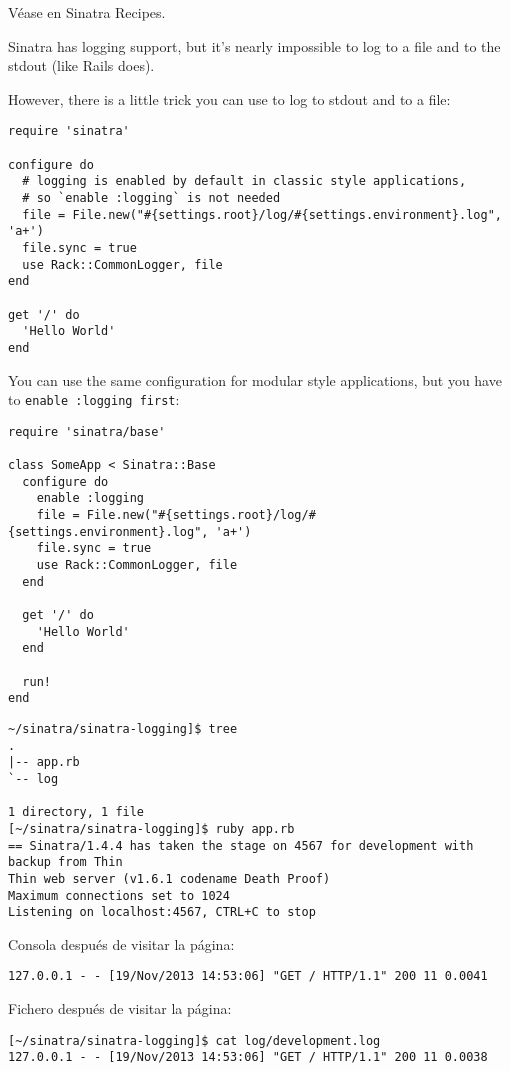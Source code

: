 
Véase 
en Sinatra Recipes.

Sinatra has logging support, but it's nearly impossible to log to a file and to the stdout (like Rails does).

However, there is a little trick you can use to log to stdout and to a file:

\begin{verbatim}
require 'sinatra'

configure do
  # logging is enabled by default in classic style applications,
  # so `enable :logging` is not needed
  file = File.new("#{settings.root}/log/#{settings.environment}.log", 'a+')
  file.sync = true
  use Rack::CommonLogger, file
end

get '/' do
  'Hello World'
end
\end{verbatim}
You can use the same configuration for modular style applications,
but you have to \verb|enable :logging first|:

\begin{verbatim}
require 'sinatra/base'

class SomeApp < Sinatra::Base
  configure do
    enable :logging
    file = File.new("#{settings.root}/log/#{settings.environment}.log", 'a+')
    file.sync = true
    use Rack::CommonLogger, file
  end

  get '/' do
    'Hello World'
  end

  run!
end
\end{verbatim}

\begin{verbatim}
~/sinatra/sinatra-logging]$ tree
.
|-- app.rb
`-- log

1 directory, 1 file
[~/sinatra/sinatra-logging]$ ruby app.rb 
== Sinatra/1.4.4 has taken the stage on 4567 for development with backup from Thin
Thin web server (v1.6.1 codename Death Proof)
Maximum connections set to 1024
Listening on localhost:4567, CTRL+C to stop
\end{verbatim}
Consola después de visitar la página:
\begin{verbatim}
127.0.0.1 - - [19/Nov/2013 14:53:06] "GET / HTTP/1.1" 200 11 0.0041
\end{verbatim}

Fichero después de visitar la página:
\begin{verbatim}
[~/sinatra/sinatra-logging]$ cat log/development.log 
127.0.0.1 - - [19/Nov/2013 14:53:06] "GET / HTTP/1.1" 200 11 0.0038
\end{verbatim}

